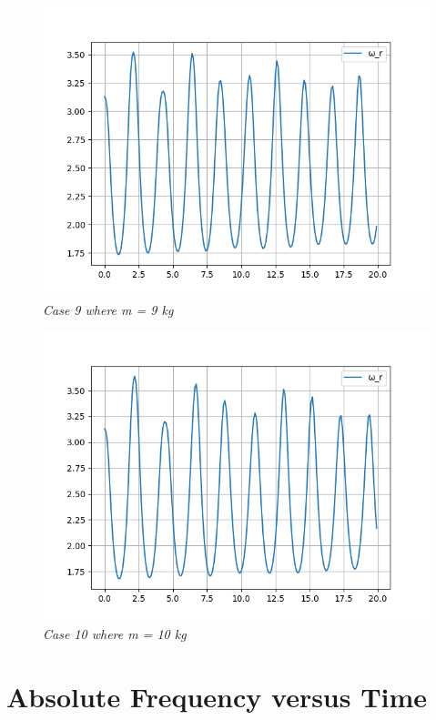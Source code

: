         \begin{figure}[H]
            \centering
            \includegraphics{Appendix/RExpPictures/F/fm9.png}
            \caption{\textit{Case 9 where m = 9 kg}}
            \label{}
        \end{figure}
            
        \begin{figure}[H]
            \centering
            \includegraphics{Appendix/RExpPictures/F/fm10.png}
            \caption{\textit{Case 10 where m = 10 kg}}
            \label{}
        \end{figure}
            
    \section{{Absolute Frequency versus Time}}
            
